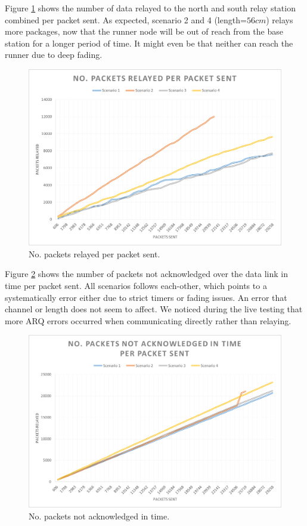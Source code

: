 \noindent Figure \ref{fig:nopacketsrelayed} shows the number of data relayed to the north  and south relay station combined per packet sent. As expected, scenario 2 and 4 (length=$56cm$) relays more packages, now that the runner node will be out of reach from the base station for a longer period of time. It might even be that neither can reach the runner due to deep fading.

\begin{figure}[h]
	\centering
	\includegraphics[width=1\linewidth]{results/NoPacketsRelayed}
	\caption{No. packets relayed per packet sent.}
	\label{fig:nopacketsrelayed}
\end{figure}

\noindent Figure \ref{fig:nopacketsnotackintime} shows the number of packets not acknowledged over the data link in time per packet sent. All scenarios follows each-other, which points to a systematically error either due to strict timers or fading issues. An error that channel or length does not seem to affect. We noticed during the live testing that more ARQ errors occurred when communicating directly rather than relaying.

\begin{figure}[h]
	\centering
	\includegraphics[width=1\linewidth]{results/NoPacketsNotACKInTime}
	\caption{No. packets not acknowledged in time.}
	\label{fig:nopacketsnotackintime}
\end{figure}

